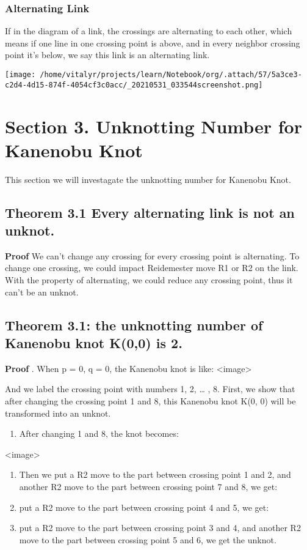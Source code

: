 \documentclass[lang=cn]{elegantpaper}
\begin{document}
\subsubsection{Alternating Link}
\label{sec:org58507cf}
If in the diagram of a link, the crossings are alternating to each other, which means if one line in one crossing point is above, and in every neighbor crossing point it's below, we say this link is an alternating link.
\begin{center}
\texttt{[image: /home/vitalyr/projects/learn/Notebook/org/.attach/57/5a3ce3-c2d4-4d15-874f-4054cf3c0acc/\_20210531\_033544screenshot.png]}
\end{center}

\section{Section 3. Unknotting Number for Kanenobu Knot}
\label{sec:org8b5031c}
This section we will investagate the unknotting number for Kanenobu Knot.
\subsection{Theorem 3.1 Every alternating link is not an unknot.}
\label{sec:org044022c}
\textbf{Proof} We can't change any crossing for every crossing point is alternating. To change one crossing, we could impact Reidemester move R1 or R2 on the link. With the property of alternating, we could reduce any crossing point, thus it can't be an unknot.
\subsection{Theorem 3.1: the unknotting number of Kanenobu knot K(0,0) is 2.}
\label{sec:org6706ac5}
\textbf{Proof} . When p = 0, q = 0, the Kanenobu knot is like:
<image>


And we label the crossing point with numbers 1, 2, \ldots{} , 8.
First, we show that after changing the crossing point 1 and 8, this Kanenobu knot K(0, 0) will be transformed into an unknot.
\begin{enumerate}
\item After changing 1 and 8, the knot becomes:
\end{enumerate}
<image>
\begin{enumerate}
\item Then we put a R2 move to the part between crossing point 1 and 2, and another R2 move to the part between crossing point 7 and 8, we get:

\item put a R2 move to the part between crossing point 4 and 5, we get:

\item put a R2 move to the part between crossing point 3 and 4, and another R2 move to the part between crossing point 5 and 6, we get the unknot.
\end{enumerate}
\end{document}
